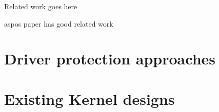 Related work goes here 

aspos paper has good related work
 
\section {Driver protection approaches }
\section{Existing Kernel designs}

% 
